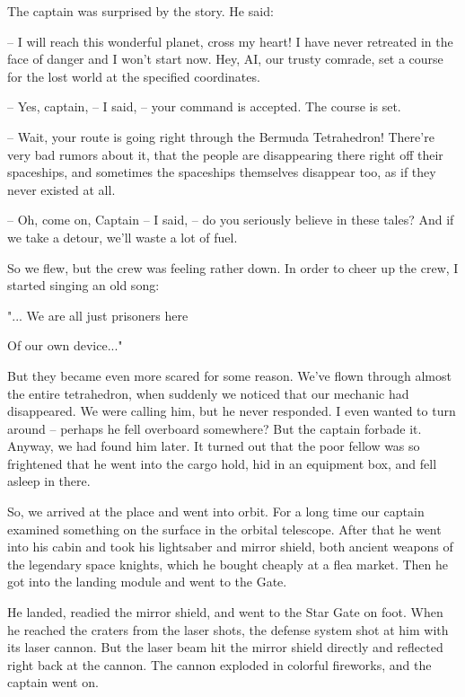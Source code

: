 \documentclass[ebook,twoside,final,openright]{memoir}
\begin{document}
\par
The captain was surprised by the story. He said:\par
– I will reach this wonderful planet, cross my heart! I have never retreated in the face of danger and I won’t start now. Hey, AI, our trusty comrade, set a course for the lost world at the specified coordinates.\par
– Yes, captain, – I said, – your command is accepted. The course is set.\par
– Wait, your route is going right through the Bermuda Tetrahedron! There’re very bad rumors about it, that the people are disappearing there right off their spaceships, and sometimes the spaceships themselves disappear too, as if they never existed at all.\par
– Oh, come on, Captain – I said, – do you seriously believe in these tales? And if we take a detour, we’ll waste a lot of fuel.\par
\par
So we flew, but the crew was feeling rather down. In order to cheer up the crew, I started singing an old song: \par
 "... We are all just prisoners here \par
 Of our own device..." \par
 But they became even more scared for some reason. We’ve flown through almost the entire tetrahedron, when suddenly we noticed that our mechanic had disappeared. We were calling him, but he never responded. I even wanted to turn around – perhaps he fell overboard somewhere? But the captain forbade it. Anyway, we had found him later. It turned out that the poor fellow was so frightened that he went into the cargo hold, hid in an equipment box, and fell asleep in there.\par
\par
So, we arrived at the place and went into orbit. For a long time our captain examined something on the surface in the orbital telescope. After that he went into his cabin and took his lightsaber and mirror shield, both ancient weapons of the legendary space knights, which he bought cheaply at a flea market. Then he got into the landing module and went to the Gate.\par
\par
He landed, readied the mirror shield, and went to the Star Gate on foot. When he reached the craters from the laser shots, the defense system shot at him with its laser cannon. But the laser beam hit the mirror shield directly and reflected right back at the cannon. The cannon exploded in colorful fireworks, and the captain went on.\par
\end{document}
